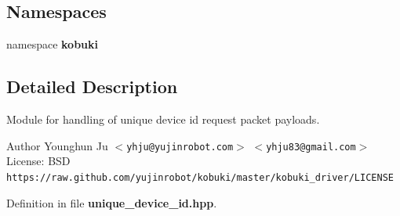 \subsection*{\-Namespaces}
\begin{DoxyCompactItemize}
\item 
namespace {\bf kobuki}
\end{DoxyCompactItemize}


\subsection{\-Detailed \-Description}
\-Module for handling of unique device id request packet payloads. \begin{DoxyAuthor}{\-Author}
\-Younghun \-Ju $<${\tt yhju@yujinrobot.\-com}$>$ $<${\tt yhju83@gmail.\-com}$>$ \-License\-: \-B\-S\-D {\tt https\-://raw.\-github.\-com/yujinrobot/kobuki/master/kobuki\-\_\-driver/\-L\-I\-C\-E\-N\-S\-E} 
\end{DoxyAuthor}


\-Definition in file {\bf unique\-\_\-device\-\_\-id.\-hpp}.

